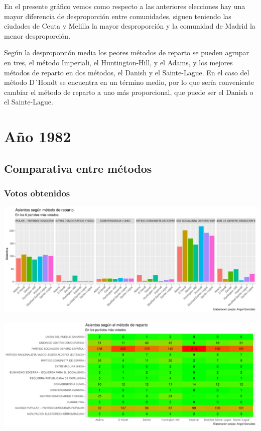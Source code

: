 \documentclass[12pt,a4paper,]{book}
\numberwithin{dummy}{section}
\theoremstyle{ocrenumbox}
\theoremstyle{blacknumex}
\theoremstyle{blacknumbox}
\theoremstyle{ocrenum}
\theoremstyle{ocrenum}
\begin{document}
En el presente gráfico vemos como respecto a las anteriores elecciones
hay una mayor diferencia de desproporción entre comunidades, siguen
teniendo las ciudades de Ceuta y Melilla la mayor desproporción y la
comunidad de Madrid la menor desproporción.

Según la desproporción media los peores métodos de reparto se pueden
agrupar en tres, el método Imperiali, el Huntington-Hill, y el Adams, y
los mejores métodos de reparto en dos métodos, el Danish y el
Sainte-Lague. En el caso del método D´Hondt se encuentra en un término
medio, por lo que sería conveniente cambiar el método de reparto a uno
más proporcional, que puede ser el Danish o el Sainte-Lague.

\hypertarget{auxf1o-1982}{%
\section{Año 1982}\label{auxf1o-1982}}

\hypertarget{comparativa-entre-muxe9todos-2}{%
\subsection{Comparativa entre
métodos}\label{comparativa-entre-muxe9todos-2}}

\hypertarget{votos-obtenidos-2}{%
\subsubsection{Votos obtenidos}\label{votos-obtenidos-2}}

\begin{center}\includegraphics[width=0.95\linewidth]{figurasR/unnamed-chunk-77-1} \end{center}

\begin{center}\includegraphics[width=0.95\linewidth]{figurasR/unnamed-chunk-77-2} \end{center}
\end{document}
